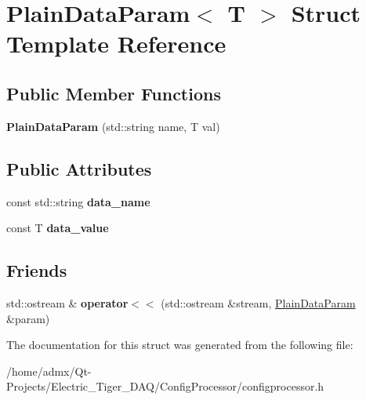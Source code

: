 \hypertarget{struct_plain_data_param}{\section{Plain\+Data\+Param$<$ T $>$ Struct Template Reference}
\label{struct_plain_data_param}
}
\subsection*{Public Member Functions}
\begin{DoxyCompactItemize}
\item 
\hypertarget{struct_plain_data_param_a794c26a7b671bb3c3ef52e7c7ba447a5}{{\bfseries Plain\+Data\+Param} (std\+::string name, T val)}\label{struct_plain_data_param_a794c26a7b671bb3c3ef52e7c7ba447a5}

\end{DoxyCompactItemize}
\subsection*{Public Attributes}
\begin{DoxyCompactItemize}
\item 
\hypertarget{struct_plain_data_param_a2376eb9c88951f9648048b4d8c46968b}{const std\+::string {\bfseries data\+\_\+name}}\label{struct_plain_data_param_a2376eb9c88951f9648048b4d8c46968b}

\item 
\hypertarget{struct_plain_data_param_a725d21ff8568129d46a516944b83ca6a}{const T {\bfseries data\+\_\+value}}\label{struct_plain_data_param_a725d21ff8568129d46a516944b83ca6a}

\end{DoxyCompactItemize}
\subsection*{Friends}
\begin{DoxyCompactItemize}
\item 
\hypertarget{struct_plain_data_param_a72df40b826bf228821a4f0e488fde836}{std\+::ostream \& {\bfseries operator$<$$<$} (std\+::ostream \&stream, \hyperlink{struct_plain_data_param}{Plain\+Data\+Param} \&param)}\label{struct_plain_data_param_a72df40b826bf228821a4f0e488fde836}

\end{DoxyCompactItemize}


The documentation for this struct was generated from the following file\+:\begin{DoxyCompactItemize}
\item 
/home/admx/\+Qt-\/\+Projects/\+Electric\+\_\+\+Tiger\+\_\+\+D\+A\+Q/\+Config\+Processor/configprocessor.\+h\end{DoxyCompactItemize}

